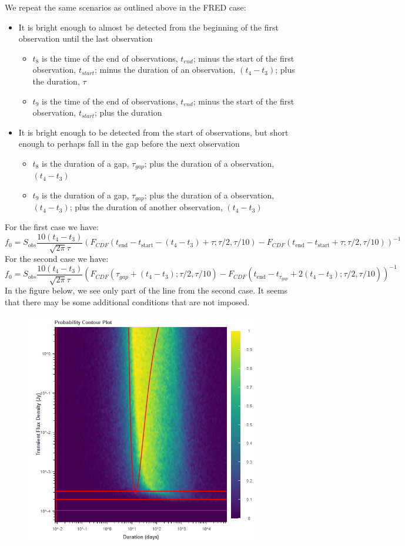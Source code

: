 \documentclass{article}
\begin{document}
We repeat the same scenarios as outlined above in the FRED case:
\begin{itemize}
	\item It is bright enough to almost be detected from the beginning of the first observation until the last observation \begin{itemize}
		\item $t_8$ is the time of the end of observations, $t_{end}$; minus the start of the first observation, $t_{start}$; minus the duration of an observation, $(t_4-t_3)$; plus the duration, $\tau$
		\item $t_9$ is the time of the end of observations,  $t_{end}$; minus the start of the first observation, $t_{start}$; plus the duration
	\end{itemize}
	\item It is bright enough to be detected from the start of observations, but short enough to perhaps fall in the gap before the next observation\begin{itemize}
		\item $t_8$ is the duration of a gap, $\tau_{gap}$; plus the duration of a observation, $(t_4-t_3)$
		\item $t_9$ is the duration of a gap, $\tau_{gap}$; plus the duration of a observation, $(t_4-t_3)$; plus the duration of another observation, $(t_4-t_3)$
	\end{itemize} 
\end{itemize}
For the first case we have:
\[f_0  =  S_{obs}\frac{10(t_4 - t_3)}{\sqrt{2\pi}\tau}(F_{CDF}(t_{\text{end}}-t_{\text{start}}-(t_4-t_3)+ \tau; \tau/2,\tau/10) -F_{CDF}(t_{\text{end}} - t_{\text{start}} + \tau; \tau/2, \tau/10))^{-1}\]
For the second case we have:
\[f_0  =  S_{obs}\frac{10(t_4 - t_3)}{\sqrt{2\pi}\tau}(F_{CDF}(\tau_{gap} + (t_4-t_3); \tau/2,\tau/10) -F_{CDF}(t_{\text{end}} - t_{\tau_{gap}} + 2(t_4-t_3); \tau/2, \tau/10))^{-1}\]
In the figure below, we see only part of the line from the second case. It seems that there may be some additional conditions that are not imposed.
\begin{figure}[H] 
	\begin{center}
		\includegraphics[width=4in]{output_gaussian_ProbContour.png}
		
		\label{gaussian}
	\end{center}
\end{figure}
\end{document}

